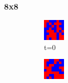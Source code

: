 \documentclass[a4paper, 11pt]{article}
\begin{document}
\subsubsection{8x8}
\begin{figure}[H]
\centering
\begin{subfigure}{.25\textwidth}
  \centering
  \includegraphics[width=0.9\linewidth]{SNOWDRIFT_MOORE_8x8_t00}
  \caption{t=0}
\end{subfigure}%
\begin{subfigure}{.25\textwidth}
  \centering
  \includegraphics[width=0.9\linewidth]{SNOWDRIFT_MOORE_8x8_t01}

\end{subfigure}
\end{figure}
\end{document}
